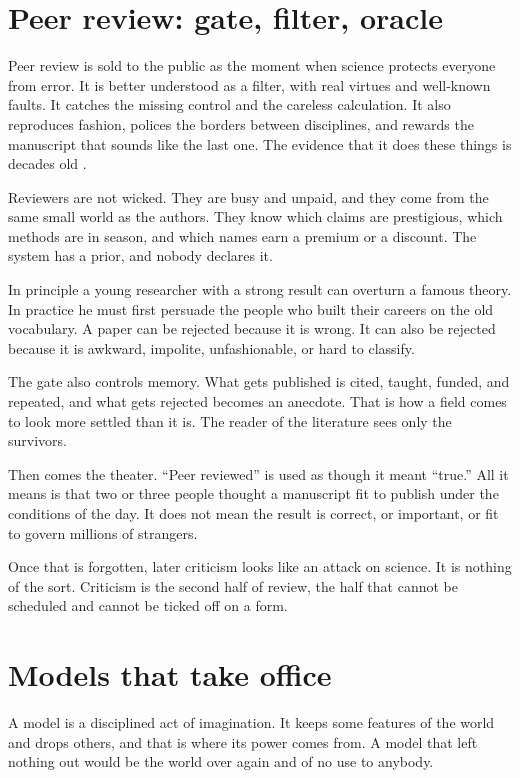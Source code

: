 \documentclass[12pt,a4paper]{book}
\begin{document}
\section{Peer review: gate, filter, oracle}

Peer review is sold to the public as the moment when science protects everyone from error. It is better understood as a filter, with real virtues and well-known faults. It catches the missing control and the careless calculation. It also reproduces fashion, polices the borders between disciplines, and rewards the manuscript that sounds like the last one. The evidence that it does these things is decades old \cite{1997-armstrong}.

Reviewers are not wicked. They are busy and unpaid, and they come from the same small world as the authors. They know which claims are prestigious, which methods are in season, and which names earn a premium or a discount. The system has a prior, and nobody declares it.

In principle a young researcher with a strong result can overturn a famous theory. In practice he must first persuade the people who built their careers on the old vocabulary. A paper can be rejected because it is wrong. It can also be rejected because it is awkward, impolite, unfashionable, or hard to classify.

The gate also controls memory. What gets published is cited, taught, funded, and repeated, and what gets rejected becomes an anecdote. That is how a field comes to look more settled than it is. The reader of the literature sees only the survivors.

Then comes the theater. ``Peer reviewed'' is used as though it meant ``true.'' All it means is that two or three people thought a manuscript fit to publish under the conditions of the day. It does not mean the result is correct, or important, or fit to govern millions of strangers.

Once that is forgotten, later criticism looks like an attack on science. It is nothing of the sort. Criticism is the second half of review, the half that cannot be scheduled and cannot be ticked off on a form.

\section{Models that take office}

A model is a disciplined act of imagination. It keeps some features of the world and drops others, and that is where its power comes from. A model that left nothing out would be the world over again and of no use to anybody.
\end{document}
